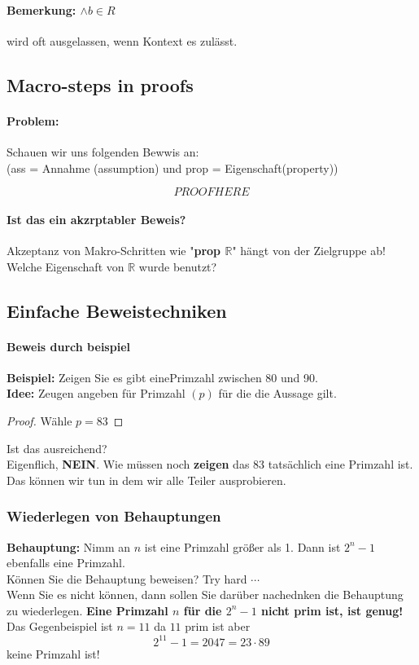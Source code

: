         \paragraph{Bemerkung: $\land b \in R$} 
            wird oft ausgelassen, wenn Kontext es zulässt.

    \subsection{Macro-steps in proofs}
    \paragraph{Problem: } 
        Schauen wir uns folgenden Bewwis an: \\ (ass = Annahme (assumption) und prop = Eigenschaft(property))

        \[
            PROOF HERE    
        \]

    \paragraph{Ist das ein akzrptabler Beweis?} 
        Akzeptanz von Makro-Schritten wie "\textbf{prop $\mathbb{R}$}" hängt von der Zielgruppe ab! \\ Welche Eigenschaft von $\mathbb{R}$ wurde benutzt?

    \subsection{Einfache Beweistechniken}
        \paragraph{Beweis durch beispiel}
        \textbf{Beispiel: } Zeigen Sie es gibt einePrimzahl zwischen 80 und 90.\\ \textbf{Idee: } Zeugen angeben für Primzahl $(p)$ für die die Aussage gilt.
        \begin{proof}
            Wähle $p = 83$
        \end{proof} 
        Ist das ausreichend?\\Eigenflich, \textbf{NEIN}. Wie müssen noch \textbf{zeigen} das 83 tatsächlich eine Primzahl ist. \\Das können wir tun in dem wir alle Teiler ausprobieren. 

        \subsubsection{Wiederlegen von Behauptungen} 
            \textbf{Behauptung: } Nimm an $n$ ist eine Primzahl größer als 1. Dann ist $2^n - 1$ ebenfalls eine Primzahl. \\Können Sie die Behauptung beweisen? Try hard $\cdots$\\ Wenn Sie es nicht können, dann sollen Sie darüber nachednken die Behauptung zu wiederlegen. \textbf{Eine Primzahl $n$ für die $2^n - 1$ nicht prim ist, ist genug!}\\ Das Gegenbeispiel ist $n = 11$ da $11$ prim ist aber \[2^{11} - 1 = 2047 = 23 \cdot 89\] keine Primzahl ist!

